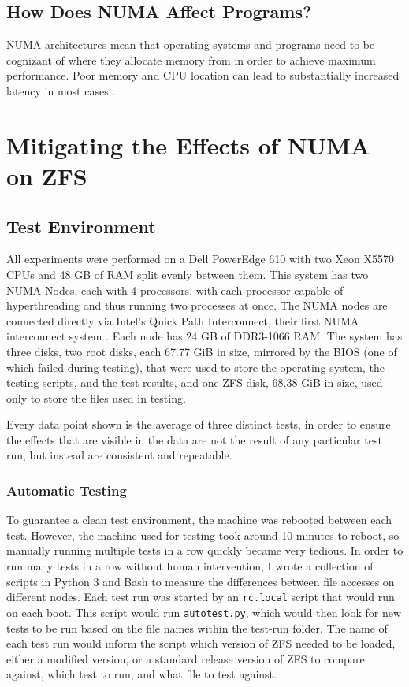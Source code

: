 \section{How Does NUMA Affect Programs?}
NUMA architectures mean that operating systems and programs need to be cognizant of where they allocate memory from in order to achieve maximum performance.
Poor memory and CPU location can lead to substantially increased latency in most cases \cite{lameter_numa_2013}.

\chapter{Mitigating the Effects of NUMA on ZFS}

\section{Test Environment}

All experiments were performed on a Dell PowerEdge 610 with two Xeon X5570 CPUs and 48 GB of RAM split evenly between them.
This system has two NUMA Nodes, each with 4 processors, with each processor capable of hyperthreading
and thus running two processes at once.
The NUMA nodes are connected directly via Intel's Quick Path Interconnect,
their first NUMA interconnect system \cite{kochhar_optimal_2009}.
Each node has 24 GB of DDR3-1066 RAM.
The system has three disks, two root disks, each 67.77 GiB in size,
mirrored by the BIOS (one of which failed during testing),
that were used to store the operating system, the testing scripts, and the test results,
and one ZFS disk, 68.38 GiB in size, used only to store the files used in testing.

Every data point shown is the average of three distinct tests, in order to ensure the effects that are visible in the data are not the result of
any particular test run, but instead are consistent and repeatable.

\subsection{Automatic Testing}
To guarantee a clean test environment, the machine was rebooted between each test.
However, the machine used for testing took around 10 minutes to reboot, so manually running multiple tests in a row
quickly became very tedious. In order to run many tests in a row without human intervention,
I wrote a collection of scripts in Python 3 and Bash 
to measure the differences between file accesses on different nodes.
Each test run was started by an \texttt{rc.local} script that would run on each boot.
This script would run \texttt{autotest.py}, which would then look for new tests to be run based on 
the file names within the test-run folder.
The name of each test run would inform the script which version of ZFS needed to be loaded,
either a modified version, or a standard release version of ZFS to compare against,
which test to run, and what file to test against.

